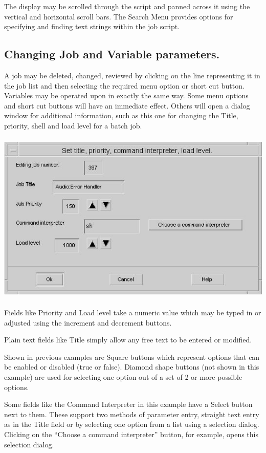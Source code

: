 The display may be scrolled through the script and panned across it using the vertical and horizontal scroll bars. The Search Menu provides
options for specifying and finding text strings within the job script.

\subsection{Changing Job and Variable parameters.}
A job may be deleted, changed, reviewed by clicking on the line representing it in the job list and then selecting the required menu
option or short cut button. Variables may be operated upon in exactly the same way. Some menu options and short cut buttons will have an
immediate effect. Others will open a dialog window for additional information, such as this one for changing the Title, priority, shell
and load level for a batch job.

 \includegraphics[width=13.877cm,height=8.28cm]{img/ref36.jpg} 

Fields like Priority and Load level take a numeric value which may be typed in or adjusted using the increment and decrement buttons.

Plain text fields like Title simply allow any free text to be entered or modified.

Shown in previous examples are Square buttons which represent options that can be enabled or disabled (true or false). Diamond shape buttons
(not shown in this example) are used for selecting one option out of a set of 2 or more possible options.

Some fields like the Command Interpreter in this example have a Select button next to them. These support two methods of parameter entry,
straight text entry as in the Title field or by selecting one option from a list using a selection dialog. Clicking on the
``Choose a command interpreter'' button, for example, opens this selection dialog.


